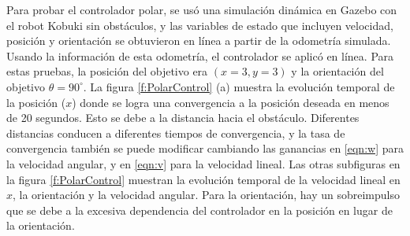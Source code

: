 Para probar el controlador polar, se usó una simulación dinámica en Gazebo con el robot 
Kobuki sin obstáculos, y las variables de estado que incluyen velocidad, posición y 
orientación se obtuvieron en línea a partir de la odometría simulada. Usando la información 
de esta odometría, el controlador se aplicó en línea. Para estas pruebas, la posición del 
objetivo era $(x = 3, y = 3)$ y la orientación del objetivo $\theta = 90^{\circ}$. La 
figura \ref{f:PolarControl} (a) muestra la evolución temporal de la posición ($x$) donde 
se logra una convergencia a la posición deseada en menos de 20 segundos. Esto se debe a 
la distancia hacia el obstáculo. Diferentes distancias conducen a diferentes tiempos de 
convergencia, y la tasa de convergencia también se puede modificar cambiando las 
ganancias en \ref{eqn:w} para la velocidad angular, y en \ref{eqn:v} para la velocidad 
lineal. Las otras subfiguras en la figura \ref{f:PolarControl} muestran la evolución 
temporal de la velocidad lineal en $x$, la orientación y la velocidad angular. Para la 
orientación, hay un sobreimpulso que se debe a la excesiva dependencia del controlador 
en la posición en lugar de la orientación.
